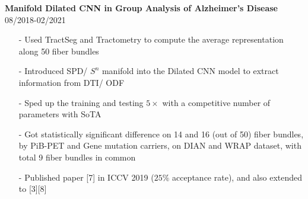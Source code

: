 \documentclass[margin]{res}
\begin{document}
\begin{resume}

                \textbf{Manifold Dilated CNN in Group Analysis of Alzheimer's Disease} \hfill 08/2018-02/2021
                \begin{itemize}\itemsep -2.2pt %
                 \item[-] Used TractSeg and Tractometry to compute the average representation along 50 fiber bundles
                 \item[-] Introduced SPD/ $S^n$ manifold into the Dilated CNN model to extract information from DTI/ ODF
                 \item[-] Sped up the training and testing $5\times$ with a competitive number of parameters with SoTA
                 \item[-] Got statistically significant difference on 14 and 16 (out of 50) fiber bundles, by PiB-PET and Gene mutation carriers, on DIAN and WRAP dataset, with total 9 fiber bundles in common
                 \item[-] Published paper [7] in ICCV 2019 ($25\%$ acceptance rate), and also extended to [3][8]
                 \end{itemize}

%


\end{resume}
\end{document}
